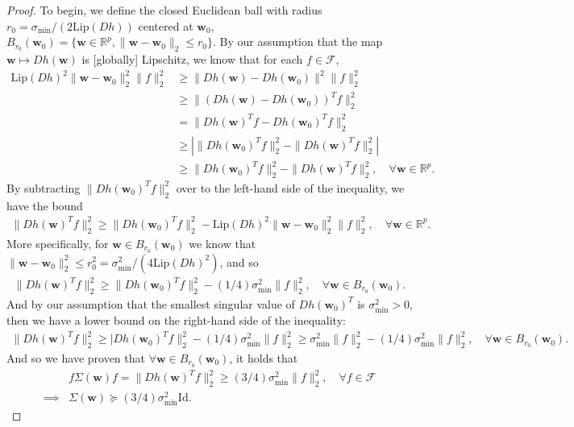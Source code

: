 \documentclass{article}
\begin{document}
\begin{proof}
To begin, we define the closed Euclidean ball with radius $r_0 = \sigma_{\text{min}}/(2\text{Lip}(Dh))$ centered at $\boldsymbol{w}_0$, $B_{r_0}(\boldsymbol{w}_0) = \{ \boldsymbol{w} \in \mathbb{R}^p, \| \boldsymbol{w} - \boldsymbol{w}_0 \|_2 \leq r_0 \}$. By our assumption that the map $\boldsymbol{w} \mapsto Dh(\boldsymbol{w})$ is [globally] Lipschitz, we know that for each $f \in \mathcal{F}$,
\begin{align*}
    \text{Lip}(Dh)^2 \| \boldsymbol{w} - \boldsymbol{w}_0 \|_2^2 \|f \|_2^2 &\geq \|Dh(\boldsymbol{w}) - Dh(\boldsymbol{w}_0)\|^2 \|f\|_2^2\\
    &\geq \|(Dh(\boldsymbol{w}) - Dh(\boldsymbol{w}_0))^Tf\|_2^2\\
    &= \|Dh(\boldsymbol{w})^Tf - Dh(\boldsymbol{w}_0)^Tf\|_2^2\\
    &\geq \left| \|Dh(\boldsymbol{w}_0)^Tf\|_2^2 - \|Dh(\boldsymbol{w})^Tf\|_2^2 \right|\\
    &\geq  \|Dh(\boldsymbol{w}_0)^Tf\|_2^2 - \|Dh(\boldsymbol{w})^Tf\|_2^2, \quad \forall \boldsymbol{w} \in \mathbb{R}^p.
\end{align*}
By subtracting $\|Dh(\boldsymbol{w}_0)^Tf\|_2^2$ over to the left-hand side of the inequality, we have the bound
\begin{align*}
    \|Dh(\boldsymbol{w})^Tf\|_2^2 \geq \|Dh(\boldsymbol{w}_0)^Tf\|_2^2 - \text{Lip}(Dh)^2 \| \boldsymbol{w} - \boldsymbol{w}_0 \|_2^2 \|f \|_2^2, \quad \forall \boldsymbol{w} \in \mathbb{R}^p.
\end{align*}
More specifically, for $\boldsymbol{w} \in B_{r_0}(\boldsymbol{w}_0)$ we know that $\| \boldsymbol{w} - \boldsymbol{w}_0 \|_2^2 \leq r_0^2 = \sigma_{\text{min}}^2/(4\text{Lip}(Dh)^2)$, and so
\begin{align*}
    \|Dh(\boldsymbol{w})^Tf\|_2^2 \geq \|Dh(\boldsymbol{w}_0)^Tf\|_2^2 - (1/4)\sigma_{\text{min}}^2\|f\|_2^2, \quad \forall \boldsymbol{w} \in B_{r_0}(\boldsymbol{w}_0).
\end{align*}
And by our assumption that the smallest singular value of $Dh(\boldsymbol{w}_0)^T$ is $\sigma_{\text{min}}^2 > 0$, then we have a lower bound on the right-hand side of the inequality:
\begin{align*}
   \|Dh(\boldsymbol{w})^Tf\|_2^2 \geq |Dh(\boldsymbol{w}_0)^Tf\|_2^2 - (1/4)\sigma_{\text{min}}^2\|f\|_2^2 \geq \sigma_{\text{min}}^2 \|f\|_2^2 - (1/4)\sigma_{\text{min}}^2\|f\|_2^2, \quad \forall \boldsymbol{w} \in B_{r_0}(\boldsymbol{w}_0).
\end{align*}
And so we have proven that $\forall \boldsymbol{w} \in B_{r_0}(\boldsymbol{w}_0)$, it holds that
\begin{align*}
&f\Sigma(\boldsymbol{w})f  = \|Dh(\boldsymbol{w})^Tf\|_2^2  \geq (3/4) \sigma_{\text{min}}^2 \|f\|_2^2, \quad \forall f \in \mathcal{F}\\
\implies& \Sigma(\boldsymbol{w}) \succeq (3/4) \sigma_{\text{min}}^2\text{Id}.
\end{align*}


\end{proof}
\end{document}
